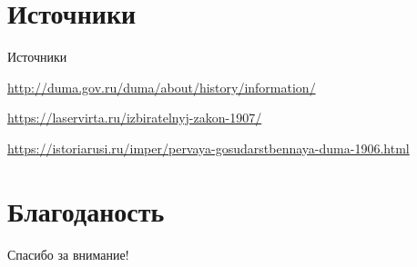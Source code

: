 \section{Источники}

\begin{frame}[t]{Источники}
	\large{
	\url{http://duma.gov.ru/duma/about/history/information/}

	\url{https://laservirta.ru/izbiratelnyj-zakon-1907/}

	\url{https://istoriarusi.ru/imper/pervaya-gosudarstbennaya-duma-1906.html}}
\end{frame}


\section{Благоданость}
\begin{frame}
	\centering
	\huge
	Спасибо за внимание!
\end{frame}


